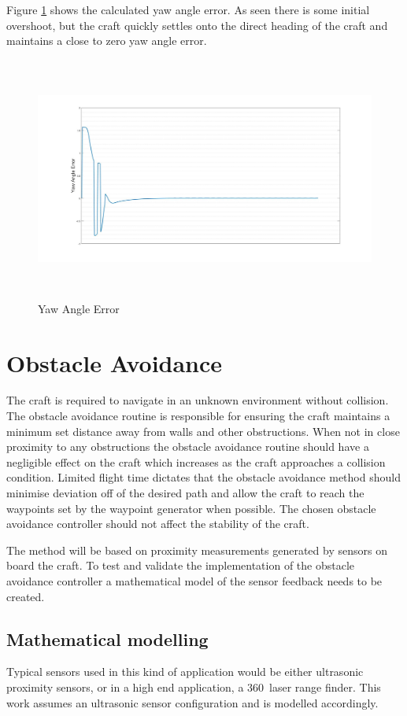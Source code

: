 		Figure \ref{IM_YawAlignmentError} shows the calculated yaw angle error. As seen there is some initial overshoot, but the craft quickly settles onto the direct heading of the craft and maintains a close to zero yaw angle error.
		
		\begin{figure}[H]
			\centering
			\includegraphics[height = 8cm]{../References/Diagrams/YawAngleError.jpg}     
			\caption{Yaw Angle Error}
			\label{IM_YawAlignmentError}
		\end{figure}
		
	\section{Obstacle Avoidance}
	The craft is required to navigate in an unknown environment without collision. The obstacle avoidance routine is responsible for ensuring the craft maintains a minimum set distance away from walls and other obstructions. When not in close proximity to any obstructions the obstacle avoidance routine should have a negligible effect on the craft which increases as the craft approaches a collision condition. Limited flight time dictates that the obstacle avoidance method should minimise deviation off of the desired path and allow the craft to reach the waypoints set by the waypoint generator when possible. The chosen obstacle avoidance controller should not affect the stability of the craft.
	
	The method will be based on proximity measurements generated by sensors on board the craft. To test and validate the implementation of the obstacle avoidance controller a mathematical model of the sensor feedback needs to be created.
	 
		\subsection{Mathematical modelling}
		Typical sensors used in this kind of application would be either ultrasonic proximity sensors, or in a high end application, a 360\textdegree\ laser range finder. This work assumes an ultrasonic sensor configuration and is modelled accordingly. 
		
